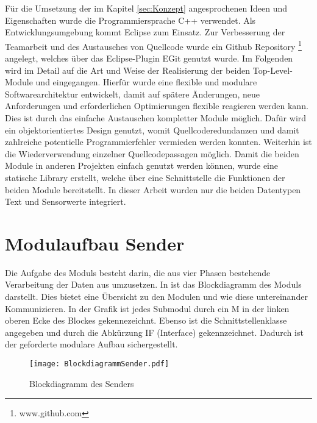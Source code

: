 
Für die Umsetzung der im Kapitel \ref{sec:Konzept} angesprochenen Ideen und
Eigenschaften wurde die Programmiersprache C++ verwendet. Als Entwicklungsumgebung kommt
Eclipse zum Einsatz. Zur Verbesserung der Teamarbeit und des Austausches
von Quellcode wurde ein Github Repository \footnote{www.github.com} angelegt,
welches über das Eclipse-Plugin EGit genutzt wurde. \newline Im Folgenden wird
im Detail auf die Art und Weise der Realisierung der beiden Top-Level-Module
 und  eingegangen. Hierfür wurde eine flexible und
modulare Softwarearchitektur entwickelt, damit auf spätere Änderungen, neue Anforderungen
und erforderlichen Optimierungen flexible reagieren werden kann. Dies ist durch
das einfache Austauschen kompletter Module möglich.
Dafür wird ein objektorientiertes Design genutzt, womit Quellcoderedundanzen und damit
zahlreiche potentielle Programmierfehler vermieden werden konnten.
Weiterhin ist die Wiederverwendung einzelner Quellcodepassagen möglich.\newline
Damit die beiden Module in anderen Projekten einfach genutzt werden können,
wurde eine statische Library erstellt, welche über eine Schnittstelle die Funktionen
der beiden Module bereitstellt. In dieser Arbeit wurden nur die beiden
Datentypen Text und Sensorwerte integriert.

\section{Modulaufbau Sender}

Die Aufgabe des Moduls  besteht darin, die aus vier Phasen
bestehende Verarbeitung der Daten aus  umzusetzen. In
 ist das Blockdiagramm des Moduls 
darstellt.
Dies bietet eine Übersicht zu den Modulen und wie diese untereinander 
Kommunizieren. In der Grafik ist jedes Submodul durch ein M in der linken
oberen Ecke des Blockes gekennezeichnt. Ebenso ist die Schnittstellenklasse angegeben
und durch die Abkürzung IF (Interface) gekennzeichnet. Dadurch ist der geforderte modulare
Aufbau sichergestellt.

\begin{figure}[H]
\centering
\texttt{[image: BlockdiagrammSender.pdf]} %
\caption{Blockdiagramm des Senders}
\label{fig:BlockdiagrammSender}
\end{figure}

